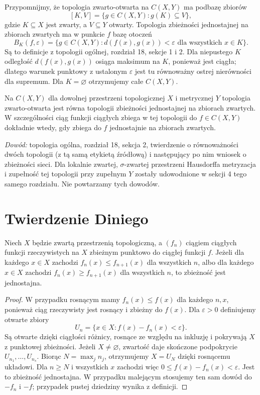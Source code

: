 Przypomnijmy, że topologia zwarto-otwarta na $C(X,Y)$
ma podbazę zbiorów
\[
 [K,V]=\{g\in C(X,Y):g(K)\subseteq V\},
\]
gdzie $K\subseteq X$ jest zwarty, a $V\subseteq Y$
otwarty. Topologia zbieżności jednostajnej na
zbiorach zwartych ma w punkcie $f$ bazę otoczeń
\[
 B_K(f,\varepsilon)=
 \{g\in C(X,Y):d(f(x),g(x))<\varepsilon
                    \text{ dla wszystkich }x\in K\}.
\]
Są to definicje z topologii ogólnej, rozdział 18,
sekcje 1 i 2. Dla niepustego $K$ odległość
$d(f(x),g(x))$ osiąga maksimum na $K$, ponieważ
jest ciągła; dlatego warunek punktowy z ustalonym
$\varepsilon$ jest tu równoważny ostrej nierówności
dla supremum. Dla $K=\varnothing$ otrzymujemy całe
$C(X,Y)$.

\begin{twierdzenie}
\label{thm:topog-odwzorowania-zwarto-otwarta-jednostajna}
Na $C(X,Y)$ dla dowolnej przestrzeni topologicznej
$X$ i metrycznej $Y$ topologia zwarto-otwarta
jest równa topologii zbieżności jednostajnej
na zbiorach zwartych. W szczególności ciąg
funkcji ciągłych zbiega w tej topologii do
$f\in C(X,Y)$ dokładnie wtedy, gdy zbiega do
$f$ jednostajnie na zbiorach zwartych.
\end{twierdzenie}
\emph{Dowód:} topologia ogólna, rozdział 18, sekcja 2,
twierdzenie o równoważności dwóch topologii
(z tą samą etykietą źródłową) i następujący po nim
wniosek o zbieżności sieci.
Dla lokalnie zwartej, $\sigma$-zwartej przestrzeni
Hausdorffa metryzacja i zupełność tej topologii
przy zupełnym $Y$ zostały udowodnione w sekcji 4
tego samego rozdziału. Nie powtarzamy tych dowodów.

\section{Twierdzenie Diniego}

\begin{twierdzenie}
\label{ma2:thm:dini}
Niech $X$ będzie zwartą przestrzenią topologiczną,
a $(f_n)$ ciągiem ciągłych funkcji rzeczywistych
na $X$ zbieżnym punktowo do ciągłej funkcji $f$.
Jeżeli dla każdego $x\in X$ zachodzi
$f_n(x)\le f_{n+1}(x)$ dla wszystkich $n$,
albo dla każdego $x\in X$ zachodzi
$f_n(x)\ge f_{n+1}(x)$ dla wszystkich $n$,
to zbieżność jest jednostajna.
\end{twierdzenie}
\begin{proof}
W przypadku rosnącym mamy $f_n(x)\le f(x)$
dla każdego $n,x$, ponieważ ciąg rzeczywisty
jest rosnący i zbieżny do $f(x)$.
Dla $\varepsilon>0$ definiujemy otwarte zbiory
\[
 U_n=\{x\in X:f(x)-f_n(x)<\varepsilon\}.
\]
Są otwarte dzięki ciągłości różnicy,
rosnące ze względu na inkluzję i pokrywają $X$
z punktowej zbieżności. Jeżeli $X\ne\varnothing$,
zwartość daje skończone podpokrycie
$U_{n_1},\ldots,U_{n_s}$. Biorąc $N=\max_j n_j$,
otrzymujemy $X=U_N$ dzięki rosnącemu układowi.
Dla $n\ge N$ i wszystkich $x$ zachodzi więc
$0\le f(x)-f_n(x)<\varepsilon$.
Jest to zbieżność jednostajna.
W przypadku malejącym stosujemy ten sam dowód
do $-f_n$ i $-f$; przypadek pustej dziedziny
wynika z definicji.
\end{proof}

